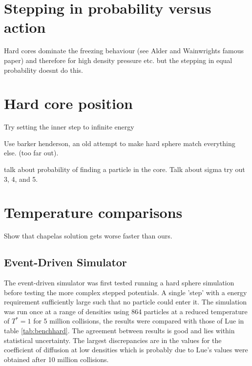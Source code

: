 \documentclass[12pt]{UoAthesis}
\begin{document}
\section{Stepping in probability versus action}

Hard cores dominate the freezing behaviour (see Alder and Wainwrights
famous paper) and therefore for high density pressure etc. but the stepping in equal probability doesnt do this.

\section{Hard core position}

Try setting the inner step to infinite energy

Use barker henderson, an old attempt to make hard sphere match
everything else. (too far out).


talk about probability of finding a particle in the core. Talk about
sigma try out 3, 4, and 5.

\section{Temperature comparisons}
Show that chapelas solution gets worse faster than ours.

\subsection{Event-Driven Simulator}
 The event-driven simulator was first tested running a hard sphere
 simulation before testing the more complex stepped potentials. A
 single 'step' with a energy requirement sufficiently large such that
 no particle could enter it. The simulation was run once at a range of
 densities using 864 particles at a reduced temperature of $T^*=1$ for
 5 million collisions, the results were compared with those of Lue
 \cite{Lue2005} in table \ref{tab:benchhard}. The agreement between
 results is good and lies within statistical uncertainty. The largest
 discrepancies are in the values for the coefficient of diffusion at
 low densities which is probably due to Lue's values were obtained
 after 10 million collisions.
\end{document}
